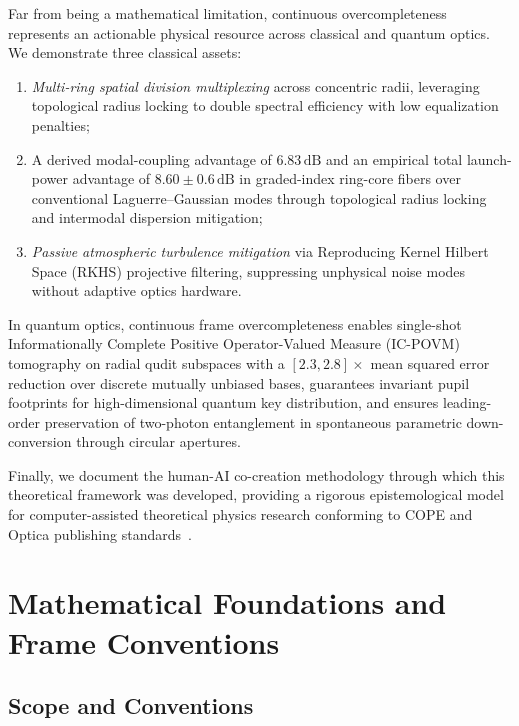\documentclass[11pt,a4paper]{article}
\begin{document}
Far from being a mathematical limitation, continuous overcompleteness represents an actionable physical resource across classical and quantum optics. We demonstrate three classical assets:
\begin{enumerate}
    \item \emph{Multi-ring spatial division multiplexing} across concentric radii, leveraging topological radius locking to double spectral efficiency with low equalization penalties;
    \item A derived modal-coupling advantage of $6.83\,\text{dB}$ and an empirical total launch-power advantage of $8.60 \pm 0.6\,\text{dB}$ in graded-index ring-core fibers over conventional Laguerre--Gaussian modes through topological radius locking and intermodal dispersion mitigation;
    \item \emph{Passive atmospheric turbulence mitigation} via Reproducing Kernel Hilbert Space (RKHS) projective filtering, suppressing unphysical noise modes without adaptive optics hardware.
\end{enumerate}
In quantum optics, continuous frame overcompleteness enables single-shot Informationally Complete Positive Operator-Valued Measure (IC-POVM) tomography on radial qudit subspaces with a $[2.3, 2.8]\times$ mean squared error reduction over discrete mutually unbiased bases, guarantees invariant pupil footprints for high-dimensional quantum key distribution, and ensures leading-order preservation of two-photon entanglement in spontaneous parametric down-conversion through circular apertures.

Finally, we document the human-AI co-creation methodology through which this theoretical framework was developed, providing a rigorous epistemological model for computer-assisted theoretical physics research conforming to COPE and Optica publishing standards~\cite{Jauhiainen2026,Haber2025,OToole2024,VillaescusaNavarro2026,Chandra2026TheoPhysEval,Kacena2024}.

\section{Mathematical Foundations and Frame Conventions}
\label{sec:foundations}

\subsection{Scope and Conventions}
\label{sec:scope_conventions}
\end{document}
